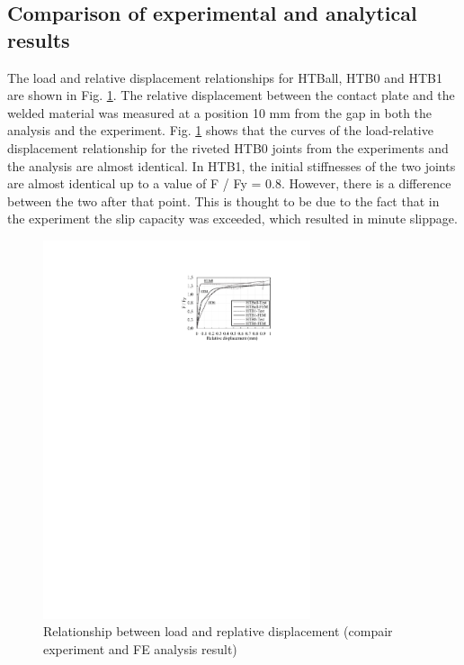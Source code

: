 \subsection{Comparison of experimental and analytical results}

The load and relative displacement relationships for HTBall, HTB0 and HTB1 are shown in Fig. \ref{ch4figA3}. The relative displacement between the contact plate and the welded material was measured at a position 10 mm from the gap in both the analysis and the experiment.
Fig. \ref{ch4figA3} shows that the curves of the load-relative displacement relationship for the riveted HTB0 joints from the experiments and the analysis are almost identical. In HTB1, the initial stiffnesses of the two joints are almost identical up to a value of F / Fy = 0.8. However, there is a difference between the two after that point. This is thought to be due to the fact that in the experiment the slip capacity was exceeded, which resulted in minute slippage.

\begin{figure}
    \centering
    \includegraphics[width=0.7\textwidth]{imgs/ch4/figA3.pdf}
    \caption{Relationship between load and replative displacement (compair experiment and FE analysis result)}
    \label{ch4figA3}
\end{figure}

